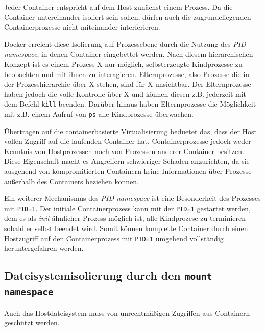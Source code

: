 \documentclass[../main.tex]{subfiles}
\begin{document}
			Jeder Container entspricht auf dem Host zunächst einem Prozess. Da die Container untereinander isoliert sein sollen, dürfen auch die zugrundeliegenden Containerprozesse nicht miteinander interferieren.

			Docker erreicht diese Isolierung auf Prozessebene durch die Nutzung des \emph{\acrshort{PID} namespace}, in denen Container eingebettet werden. Nach diesem hierarchischen Konzept ist es einem Prozess X nur möglich, selbsterzeugte Kindprozesse zu beobachten und mit ihnen zu interagieren. Elternprozesse, also Prozesse die in der Prozesshierarchie über X stehen, sind für X unsichtbar. Der Elternprozesse haben jedoch die volle Kontrolle über X und können diesen z.B. jederzeit mit dem Befehl \texttt{kill} beenden. Darüber hinaus haben Elternprozesse die Möglichkeit mit z.B. einem Aufruf von \texttt{ps} alle Kindprozesse überwachen.

			Übertragen auf die containerbasierte Virtualisierung beduetet das, dass der Host vollen Zugriff auf die laufenden Container hat, Containerprozesse jedoch weder Kenntnis von Hostprozessen noch von Prozessen anderer Container besitzen. Diese Eigenschaft macht es Angreifern schwieriger Schaden anzurichten, da sie ausgehend von kompromitierten Containern keine Informationen über Prozesse außerhalb des Containers beziehen können.

			Ein weiterer Mechanismus des \emph{\acrshort{PID}-namespace} ist eine Besonderheit des Prozesses mit \texttt{PID=1}. Der initiale Containerprozess kann mit der \texttt{PID=1} gestartet werden, dem es als \emph{init}-ähnlicher Prozess möglich ist, alle Kindprozese zu terminieren sobald er selbst beendet wird. Somit können komplette Container durch einen Hostzugriff auf den Containerprozess mit \texttt{PID=1} umgehend vollständig heruntergefahren werden.

			\cite[S.4]{dockerSec1}




    \subsection{Dateisystemisolierung durch den \texttt{mount namespace}}
			Auch das Hostdateisystem muss von unrechtmäßigen Zugriffen aus Containern geschützt werden.
\end{document}
